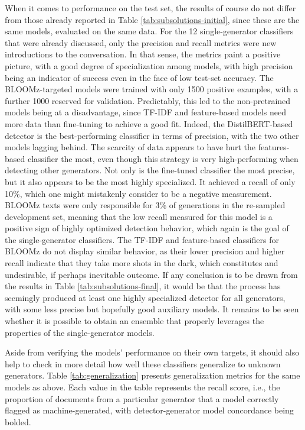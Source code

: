 When it comes to performance on the test set, the results of course do not differ from those already reported in Table \ref{tab:subsolutions-initial}, since these are the same models, evaluated on the same data.
For the 12 single-generator classifiers that were already discussed, only the precision and recall metrics were new introductions to the conversation.
In that sense, the metrics paint a positive picture, with a good degree of specialization among models, with high precision being an indicator of success even in the face of low test-set accuracy.
The BLOOMz-targeted models were trained with only 1500 positive examples, with a further 1000 reserved for validation.
Predictably, this led to the non-pretrained models being at a disadvantage, since TF-IDF and feature-based models need more data than fine-tuning to achieve a good fit.
Indeed, the DistilBERT-based detector is the best-performing classifier in terms of precision, with the two other models lagging behind.
The scarcity of data appears to have hurt the features-based classifier the most, even though this strategy is very high-performing when detecting other generators.
Not only is the fine-tuned classifier the most precise, but it also appears to be the most highly specialized.
It achieved a recall of only 10\%, which one might mistakenly consider to be a negative measurement.
BLOOMz texts were only responsible for 3\% of generations in the re-sampled development set, meaning that the low recall measured for this model is a positive sign of highly optimized detection behavior, which again is the goal of the single-generator classifiers.
The TF-IDF and feature-based classifiers for BLOOMz do not display similar behavior, as their lower precision and higher recall indicate that they take more shots in the dark, which constitutes and undesirable, if perhaps inevitable outcome.
If any conclusion is to be drawn from the results in Table \ref{tab:subsolutions-final}, it would be that the process has seemingly produced at least one highly specialized detector for all generators, with some less precise but hopefully good auxiliary models.
It remains to be seen whether it is possible to obtain an ensemble that properly leverages the properties of the single-generator models.

Aside from verifying the models' performance on their own targets, it should also help to check in more detail how well these classifiers generalize to unknown generators.
Table \ref{tab:generalization} presents generalization metrics for the same models as above.
Each value in the table represents the recall score, i.e., the proportion of documents from a particular generator that a model correctly flagged as machine-generated, with detector-generator model concordance being bolded.

